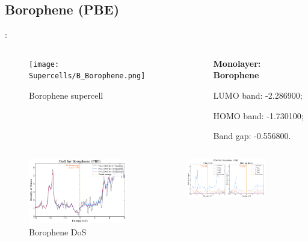 \documentclass[xcolor=dvipsnames]{beamer}
\begin{document}
\subsection{Borophene (PBE)}
\begin{frame}{\insertsection: \insertsubsection}
\begin{columns}
    \begin{column}{0.5\textwidth}\begin{figure}
        \texttt{[image: Supercells/B\_Borophene.png]}
        \caption{Borophene supercell}
    \end{figure}\end{column}
    \begin{column}{0.5\textwidth}
        \par \textbf{Monolayer: Borophene}
        \par\quad LUMO band: -2.286900;
        \par\quad HOMO band: -1.730100;
        \par\quad Band gap: -0.556800.
    \end{column}
\end{columns}
\begin{columns}
    \begin{column}{0.45\textwidth}\begin{figure}
        \includegraphics[width=1\textwidth]{PDoS/Borophene_dos.png}
        \caption{Borophene DoS}
    \end{figure}\end{column}
    \begin{column}{0.55\textwidth}\begin{figure}
        \includegraphics[width=0.8\textwidth]{PDoS/Borophene_pdos.png}

\end{figure}
\end{column}
\end{columns}
\end{frame}
\end{document}
